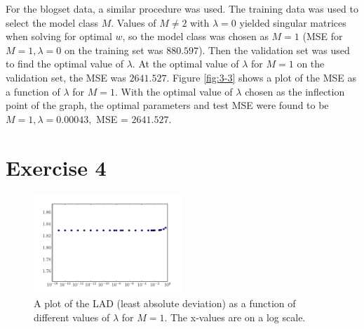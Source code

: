 \documentclass[10pt]{article}
\begin{document}
For the blogset data, a similar procedure was used. The training data was used to select the model class $M$. Values of $M \neq 2$ with $\lambda = 0$ yielded singular matrices when solving for optimal $w$, so the model class was chosen as $M = 1$ (MSE for $M = 1, \lambda = 0$ on the training set was $880.597$). Then the validation set was used to find the optimal value of $\lambda$. At the optimal value of $\lambda$ for $M = 1$ on the validation set, the MSE was $2641.527$. Figure \ref{fig:3-3} shows a plot of the MSE as a function of $\lambda$ for $M = 1$. With the optimal value of $\lambda$ chosen as the inflection point of the graph, the optimal parameters and test MSE were found to be $M = 1, \lambda = 0.00043,$ MSE = $2641.527$. 

\section{Exercise 4}

\begin{figure}[!ht]
	\centering
	\includegraphics[width=0.5\textwidth]{exercise4-1.pdf}
	\caption{A plot of the LAD (least absolute deviation) as a function of different values of $\lambda$ for $M = 1$. The x-values are on a log scale.}
	\label{fig:4-1}
\end{figure}
\end{document}
